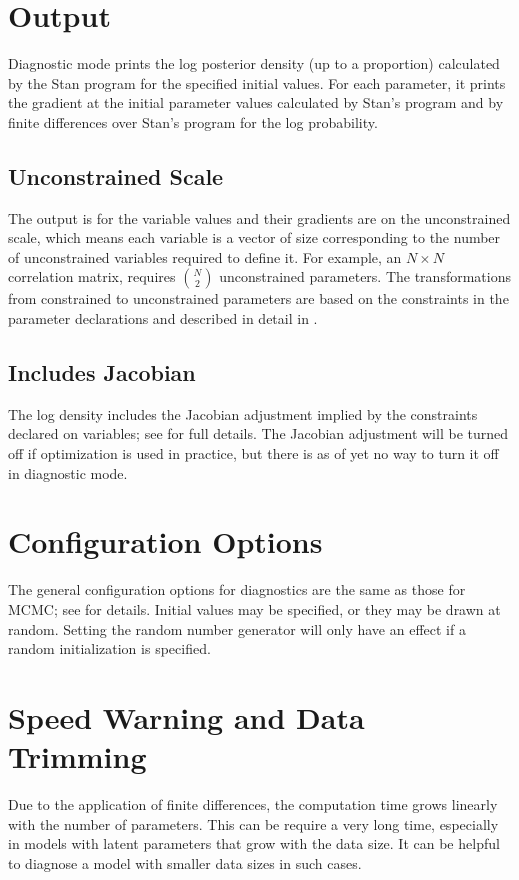 \section{Output}

Diagnostic mode prints the log posterior density (up to a proportion)
calculated by the Stan program for the specified initial values. For
each parameter, it prints the gradient at the initial parameter values
calculated by Stan's program and by finite differences over Stan's
program for the log probability.

\subsection{Unconstrained Scale}

The output is for the variable values and their gradients are on the
unconstrained scale, which means each variable is a vector of size
corresponding to the number of unconstrained variables required to
define it. For example, an $N \times N$ correlation matrix, requires
$\binom{N}{2}$ unconstrained parameters. The
transformations from constrained to unconstrained parameters are based
on the constraints in the parameter declarations and described in
detail in .

\subsection{Includes Jacobian}

The log density includes the Jacobian adjustment implied by the
constraints declared on variables; see
 for full details. The Jacobian
adjustment will be turned off if optimization is used in practice, but
there is as of yet no way to turn it off in diagnostic mode.

\section{Configuration Options}

The general configuration options for diagnostics are the same as
those for MCMC; see  for details. Initial
values may be specified, or they may be drawn at random. Setting the
random number generator will only have an effect if a random
initialization is specified.

\section{Speed Warning and Data Trimming}

Due to the application of finite differences, the computation time
grows linearly with the number of parameters. This can be require a
very long time, especially in models with latent parameters that grow
with the data size. It can be helpful to diagnose a model with smaller
data sizes in such cases.


